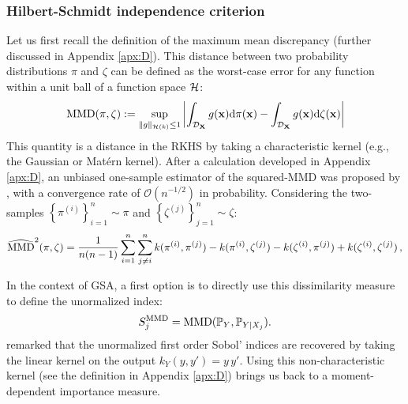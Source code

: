 \subsubsection{Hilbert-Schmidt independence criterion}

Let us first recall the definition of the maximum mean discrepancy (further discussed in Appendix \ref{apx:D}). 
This distance between two probability distributions $\pi$ and $\zeta$ can be defined as the worst-case error for any function within a unit ball of a function space $\mathcal{H}$:
\begin{equation}
    \mathrm{MMD}(\pi, \zeta) := \sup_{\lVert g \lVert_{\mathcal{H}(k)} \leq 1} \left | \int_{\mathcal{D}_{{\bf X}}} g({\bf x}) \mathrm{d} \pi({\bf x}) - \int_{\mathcal{D}_{{\bf X}}} g({\bf x}) \mathrm{d} \zeta({\bf x}) \right | 
    \label{eq:mmd_chapter1}  
\end{equation}
This quantity is a distance in the RKHS by taking a characteristic kernel (e.g., the Gaussian or Matérn kernel). 
After a calculation developed in Appendix \ref{apx:D}, an unbiased one-sample estimator of the squared-MMD was proposed by \citet{gretton_2006}, 
with a convergence rate of $\mathcal{O}(n^{-1/2})$ in probability. 
Considering the two-samples $\left\{\pi^{(i)}\right\}_{i=1}^n \sim \pi$ and $\left\{\zeta^{(j)}\right\}_{j=1}^n \sim \zeta$: 
\begin{equation}
    \widehat{\mathrm{MMD}}^2(\pi, \zeta) = \frac{1}{n (n-1)} \sum_{i=1}^{n} \sum_{j \neq i}^{n} 
                                k(\pi^{(i)}, \pi^{(j)}) - k(\pi^{(i)}, \zeta^{(j)}) - k(\zeta^{(i)}, \pi^{(j)}) + k(\zeta^{(i)}, \zeta^{(j)}) \, , 
\label{eq:mmd_ustat}
\end{equation}

In the context of GSA, a first option is to directly use this dissimilarity measure to define the unormalized index: 
\begin{equation}
    S_j^{\mathrm{MMD}} = \mathrm{MMD}(\mathbb{P}_Y, \mathbb{P}_{Y |X_j}). 
    \label{eq:mmd_gsa}
\end{equation}
\citet{daveiga_2021_kernel_ANOVA} remarked that the unormalized first order Sobol' indices are recovered by taking the linear kernel on the output $k_{Y}(y, y')=y\, y'$. 
Using this non-characteristic kernel (see the definition in Appendix \ref{apx:D}) brings us back to a moment-dependent importance measure. 

